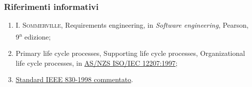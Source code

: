 \subsubsection{Riferimenti informativi}
\begin{enumerate}
	\item \textsc{I. Sommerville}, \guillemotleft Requirements engineering\guillemotright, in \textit{Software engineering}, Pearson, 9\textsuperscript{a} edizione;
	\item \guillemotleft Primary life cycle processes, Supporting life cycle processes, Organizational life cycle processes\guillemotright, in \href{https://www.math.unipd.it/~tullio/IS-1/2009/Approfondimenti/ISO_12207-1995.pdf}{AS/NZS ISO/IEC 12207:1997};
	\item \href{https://www.cs.purdue.edu/homes/apm/courses/BITSC461-fall03/miller-guidelines/IEEE830-1998.html}{Standard IEEE 830-1998 commentato}.
\end{enumerate}


